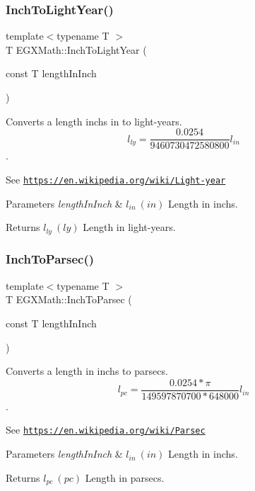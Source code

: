 \subsubsection{\texorpdfstring{Inch\+To\+Light\+Year()}{InchToLightYear()}}
{\footnotesize\ttfamily template$<$typename T $>$ \\
T E\+G\+X\+Math\+::\+Inch\+To\+Light\+Year (\begin{DoxyParamCaption}\item[{const T}]{length\+In\+Inch }\end{DoxyParamCaption})}



Converts a length inchs in to light-\/years. \[ l_{ly}=\frac{0.0254}{9460730472580800} l_{in} \]. 

See \href{https://en.wikipedia.org/wiki/Light-year}{\tt https\+://en.\+wikipedia.\+org/wiki/\+Light-\/year} 
\begin{DoxyParams}{Parameters}
{\em length\+In\+Inch} & $ l_{in}\ (in)$ Length in inchs. \\
\hline
\end{DoxyParams}
\begin{DoxyReturn}{Returns}
$ l_{ly}\ (ly)$ Length in light-\/years. 
\end{DoxyReturn}
\mbox{\label{group___e_g_x_math-_conversions-_length_conversions-_imperial-_inch-_astronomical_ga5a93231e0372e2fe2c27ef5405175784}} 
\subsubsection{\texorpdfstring{Inch\+To\+Parsec()}{InchToParsec()}}
{\footnotesize\ttfamily template$<$typename T $>$ \\
T E\+G\+X\+Math\+::\+Inch\+To\+Parsec (\begin{DoxyParamCaption}\item[{const T}]{length\+In\+Inch }\end{DoxyParamCaption})}



Converts a length in inchs to parsecs. \[ l_{pc}=\frac{0.0254 * \pi}{149597870700 * 648000} l_{in} \]. 

See \href{https://en.wikipedia.org/wiki/Parsec}{\tt https\+://en.\+wikipedia.\+org/wiki/\+Parsec} 
\begin{DoxyParams}{Parameters}
{\em length\+In\+Inch} & $ l_{in}\ (in)$ Length in inchs. \\
\hline
\end{DoxyParams}
\begin{DoxyReturn}{Returns}
$ l_{pc}\ (pc)$ Length in parsecs. 
\end{DoxyReturn}
